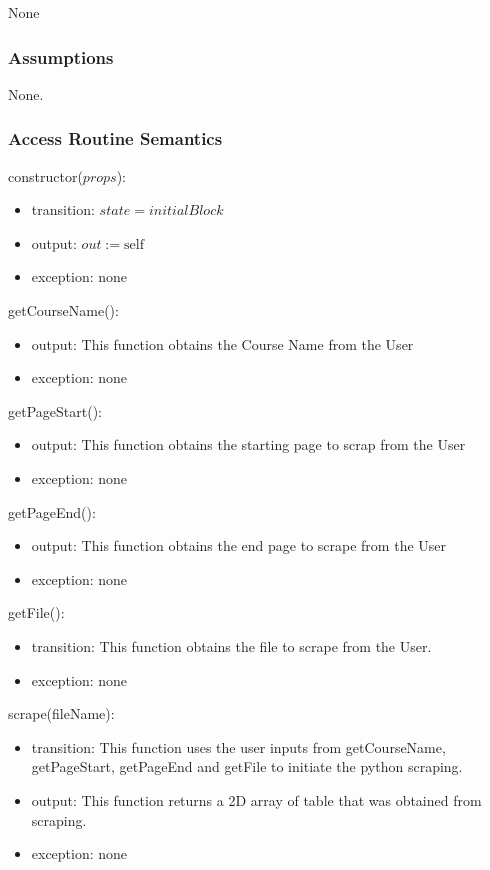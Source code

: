\documentclass[12pt, titlepage]{article}
\begin{document}
None

\subsubsection{Assumptions}

None.

\subsubsection{Access Routine Semantics}

\noindent constructor($props$):
\begin{itemize}
\item transition: $\mathit{state} = initialBlock$
\item output: $out := \mbox{self}$
\item exception: none
\end{itemize}

\noindent getCourseName():
\begin{itemize}
\item output: This function obtains the Course Name from the User
\item exception: none
\end{itemize}

\noindent getPageStart():
\begin{itemize}
\item output: This function obtains the starting page to scrap from the User
\item exception: none
\end{itemize}

\noindent getPageEnd():
\begin{itemize}
\item output: This function obtains the end page to scrape from the User
\item exception: none
\end{itemize}

\noindent getFile():
\begin{itemize}
\item transition: This function obtains the file to scrape from the User.
\item exception: none
\end{itemize}

\noindent scrape(fileName):
\begin{itemize}
\item transition: This function uses the user inputs from getCourseName, getPageStart, getPageEnd and getFile to initiate the python scraping.
\item output: This function returns a 2D array of table that was obtained from scraping.
\item exception: none
\end{itemize}
\end{document}
